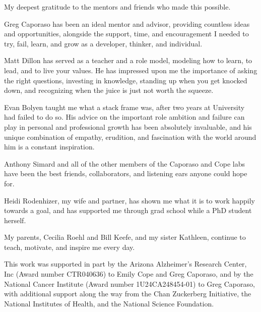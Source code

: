 My deepest gratitude to the mentors and friends who made this possible.

Greg Caporaso has been an ideal mentor and advisor, providing countless ideas
and opportunities, alongside the support, time, and encouragement I needed to
try, fail, learn, and grow as a developer, thinker, and individual.

Matt Dillon has served as a teacher and a role model, modeling how to learn,
to lead, and to live your values. He has impressed upon me the importance of
asking the right questions, investing in knowledge, standing up when you get
knocked down, and recognizing when the juice is just not worth the squeeze.

Evan Bolyen taught me what a stack frame was, after two years at University had
failed to do so. His advice on the important role ambition and failure can play
in personal and professional growth has been absolutely invaluable, and 
his unique combination of empathy, erudition, and fascination with the world
around him is a constant inspiration.

Anthony Simard and all of the other members of the Caporaso and Cope labs have
been the best friends, collaborators, and listening ears anyone could hope for.

Heidi Rodenhizer, my wife and partner, has shown me what it is to work happily
towards a goal, and has supported me through grad school while a PhD student
herself.

My parents, Cecilia Roehl and Bill Keefe, and my sister Kathleen, continue to
teach, motivate, and inspire me every day.

This work was supported in part by the Arizona Alzheimer’s Research Center, Inc
(Award number CTR040636) to Emily Cope and Greg Caporaso, and by the National
Cancer Institute (Award number 1U24CA248454-01) to Greg Caporaso, with
additional support along the way from the Chan Zuckerberg Initiative, the
National Institutes of Health, and the National Science Foundation.